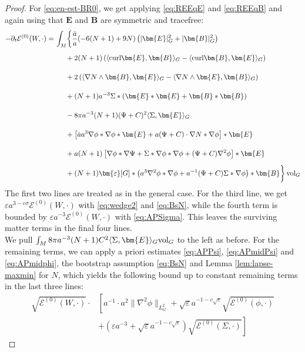 \documentclass[11pt,leqno,textwidth=10cm]{amsart}
\numberwithin{equation}{section}
\theoremstyle{definition}
\theoremstyle{plain}
\newcommand{\1}{\mathbbm{1}}
\newcommand{\E}{\mathcal{E}}
\newcommand{\vol}[1]{{\text{\normalfont{vol}}}_{#1}}
\renewcommand{\epsilon}{\varepsilon}
\newcommand{\del}{\partial}
\newcommand{\curl}{\text{\normalfont{curl}}}
\newcommand{\RE}{\bm{E}}
\newcommand{\RB}{\bm{B}}
\newcommand{\epsilonLC}{\bm{\epsilon}}
\begin{document}
\begin{proof}
For \eqref{eq:en-est-BR0}, we get applying \eqref{eq:REEqE} and \eqref{eq:REEqB} and again using that $\RE$ and $\RB$ are symmetric and tracefree:
\begin{align*}
-\del_t\E^{(0)}(W,\cdot)=&\,\int_M\biggr\{\frac{\dot{a}}a(-6(N+1)+9N)\left(\lvert\RE\rvert_G^2+\lvert\RB\rvert_G^2\right)\\
&\,\phantom{\int_M}+2(N+1)\left(\langle\curl\RE,\RB\rangle_G-\langle\curl\RB,\RE\rangle_G\right)\\
&\,\phantom{\int_M}+2\left(\langle\nabla N\wedge \RB,\RE\rangle_G-\langle\nabla N\wedge\RE,\RB\rangle_G\right)\\
&\,\phantom{\int_M}+(N+1)a^{-3}\Sigma\ast\left(\RE\ast\RE+\RB\ast\RB\right)\\
&\,\phantom{\int_M}-8\pi a^{-3}(N+1)(\Psi+C)^2\langle\Sigma,\RE\rangle_G\\
&\,\phantom{\int_M}+\left[\dot{a}a^3\nabla\phi\ast\nabla\phi\ast\RE+a(\Psi+C)\cdot\nabla N\ast\nabla\phi\right]\ast\RE\\
&\,\phantom{\int_M}+a(N+1)\left[\nabla\phi\ast\nabla\Psi+\Sigma\ast\nabla\phi\ast\nabla\phi+(\Psi+C)\nabla^2\phi\right]\ast\RE\\
&\,\phantom{\int_M}+(N+1)\epsilonLC[G]\ast\left(a^3\nabla^2\phi\ast\nabla\phi+a^{-1}(\Psi+C)\Sigma\ast\nabla\phi\right)\ast\RB\biggr\}\,\vol{G}
\end{align*}
The first two lines are treated as in the general case. For the third line, we get $\epsilon a^{3-c\sigma}\E^{(0)}(W,\cdot)$ with \eqref{eq:wedge2} and \eqref{eq:BsN}, while the fourth term is bounded by $\epsilon a^{-3}\E^{(0)}(W,\cdot)$ with \eqref{eq:APSigma}. This leaves the surviving matter terms in the final four lines.\\
We pull $\int_M8\pi a^{-3}(N+1)C^2\langle\Sigma,\RE\rangle_G\vol{G}$ to the left as before. For the remaining terms, we can apply a priori estimates \eqref{eq:APPsi}, \eqref{eq:APmidPsi} and \eqref{eq:APmidphi}, the bootstrap assumption \eqref{eq:BsN} and Lemma \ref{lem:lapse-maxmin} for $N$, which yields the following bound up to constant remaining terms in the last three lines:
\begin{align*}
\sqrt{\E^{(0)}(W,\cdot)}\cdot&\left[a^{-1}\cdot a^2\|\nabla^2\phi\|_{L^2_G}+\sqrt{\epsilon}a^{-1-c\sqrt{\epsilon}}\sqrt{\E^{(0)}(\phi,\cdot)}\right.\\
&\left.+\left(\epsilon a^{-3}+\sqrt{\epsilon}a^{-1-c\sqrt{\epsilon}}\right)\sqrt{\E^{(0)}(\Sigma,\cdot)}\right]
\end{align*}

\end{proof}
\end{document}
